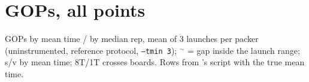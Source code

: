 \section{ GOPs, all points}\label{app:85}
GOPs by mean time / by median rep, mean of 3 launches per packer (uninstrumented, reference protocol, \texttt{--tmin 3}); $^{\sim}$ = gap inside the launch range; s/v by mean time; 8T/1T crosses boards. Rows from 's script with the true mean time.
